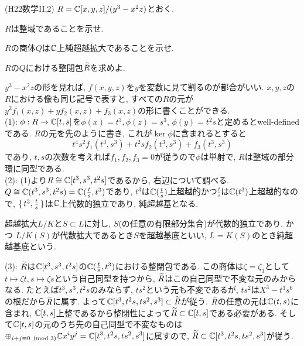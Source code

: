 \begin{egprob} (H22数学II,2) $R = \mathbb{C}[x,y,z]/(y^3-x^2z)$とおく.
\ben
\item $R$は整域であることを示せ.
\item $R$の商体$Q$は$\mathbb{C}$上純超越拡大であることを示せ.
\item $R$の$Q$における整閉包$\widetilde{R}$を求めよ.
\een
\end{egprob}
\begin{egans}
$y^3-x^2z$の形を見れば, $f(x,y,z)$を$y$を変数に見て割るのが都合がいい. $x,y,z$の$R$における像も同じ記号で表すと, すべての$R$の元が$y^2f_1(x,z) + yf_2(x,z) + f_3(x,z)$の形に書くことができる. \\
(1): $\phi:R\to \mathbb{C}[t,s]$を$\phi(x) = t^3, \phi(z) = s^3$, $\phi(y) = t^2s$と定めるとwell-definedである. $R$の元を先のように書き, これが$\ker{\phi}$に含まれるとすると
\[t^4s^2f_1(t^3,s^3) + t^2sf_2(t^3,s^3) + f_3(t^3,s^3)\]
であり, $t,s$の次数を考えれば$f_1,f_2,f_3 = 0$が従うので$\phi$は単射で, $R$は整域の部分環に同型である. \\
(2): (1)より$R\cong \mathbb{C}[t^3,s^3,t^2s]$であるから, 右辺について調べる. $Q\cong \mathbb{C}(t^3,s^3,t^2s) = \mathbb{C}(\frac{t}{s},t^3)$であり, $t^3$は$\mathbb{C}(\frac{t}{s})$上超越的かつ$\frac{t}{s}$は$\mathbb{C}(t^3)$上超越的なので, $\set{t^3,\frac{t}{s}}$は$\mathbb{C}$上代数的独立であり, 純超越基となる.
\begin{recall}
超越拡大$L/K$と$S\subset L$に対し, $S$(の任意の有限部分集合)が代数的独立であり, かつ $L/K(S)$が代数拡大であるとき$S$を超越基底といい, $L=K(S)$のとき純超越基底という.
\end{recall}
(3): $\widetilde{R}$は$\mathbb{C}[t^3,s^3,t^2s]$の$\mathbb{C}(\frac{t}{s},t^3)$における整閉包である. この商体は$\zeta = \zeta_3$として$t\mapsto \zeta t, s\mapsto \zeta s$という自己同型を持つから, $\widetilde{R}$はこの自己同型で不変な元のみからなる. たとえば$t^3,s^3,t^2s$のみならず, $ts^2$という元も不変であるが, $ts^2$は$X^3 - t^3s^6$の根だから$\widetilde{R}$に属す. よって$\mathbb{C}[t^3,t^2s,ts^2,s^3]\subset \widetilde{R}$が従う. $\widetilde{R}$の任意の元は$\mathbb{C}(t,s)$に含まれ, $\mathbb{C}[t,s]$上整であるから整閉性によって$\widetilde{R}\subset \mathbb{C}[t,s]$である必要がある. そして$\mathbb{C}[t,s]$の元のうち先の自己同型で不変なものは$\displaystyle\oplus_{i+j\equiv 0\pmod{3}} \mathbb{C}x^iy^j = \mathbb{C}[t^3,t^2s,ts^2,s^3]$に属すので, $\widetilde{R}\subset \mathbb{C}[t^3,t^2s,ts^2,s^3]$が従う.
\end{egans}







